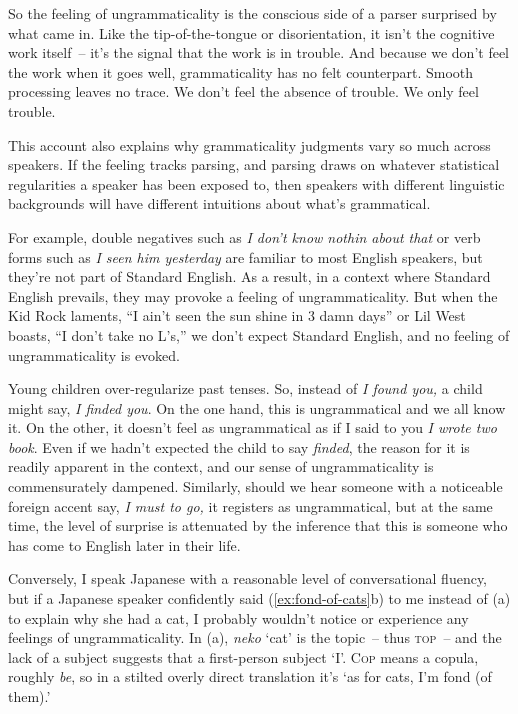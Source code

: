 \bigskip

So the feeling of ungrammaticality is the conscious side of a parser surprised by what came in. Like the tip-of-the-tongue or disorientation, it isn't the cognitive work itself~-- it's the signal that the work is in trouble. And because we don't feel the work when it goes well, grammaticality has no felt counterpart. Smooth processing leaves no trace. We don't feel the absence of trouble. We only feel trouble.

\bigskip

This account also explains why grammaticality judgments vary so much across speakers. If the feeling tracks parsing, and parsing draws on whatever statistical regularities a speaker has been exposed to, then speakers with different linguistic backgrounds will have different intuitions about what's grammatical.

For example, double negatives such as \textit{I don't know nothin about that} or verb forms such as \textit{I seen him yesterday} are familiar to most English speakers, but they're not part of Standard English. As a result, in a context where Standard English prevails, they may provoke a feeling of ungrammaticality. But when the Kid Rock laments, ``I ain't seen the sun shine in 3 damn days'' or Lil West boasts, ``I don't take no L's,'' we don't expect Standard English, and no feeling of ungrammaticality is evoked.

Young children over-regularize past tenses. So, instead of \textit{I found you,} a child might say, \textit{I finded you}. On the one hand, this is ungrammatical and we all know it. On the other, it doesn't feel as ungrammatical as if I said to you \textit{I wrote two book}. Even if we hadn't expected the child to say \textit{finded}, the reason for it is readily apparent in the context, and our sense of ungrammaticality is commensurately dampened. Similarly, should we hear someone with a noticeable foreign accent say, \textit{I must to go,} it registers as ungrammatical, but at the same time, the level of surprise is attenuated by the inference that this is someone who has come to English later in their life.

Conversely, I speak Japanese with a reasonable level of conversational fluency, but if a Japanese speaker confidently said (\ref{ex:fond-of-cats}b) to me instead of (a) to explain why she had a cat, I probably wouldn't notice or experience any feelings of ungrammaticality. In (a), \textit{neko} `cat' is the topic~-- thus \textsc{top}~-- and the lack of a subject suggests that a first-person subject `I'. \textsc{Cop} means a copula, roughly \textit{be}, so in a stilted overly direct translation it's `as for cats, I'm fond (of them).'

